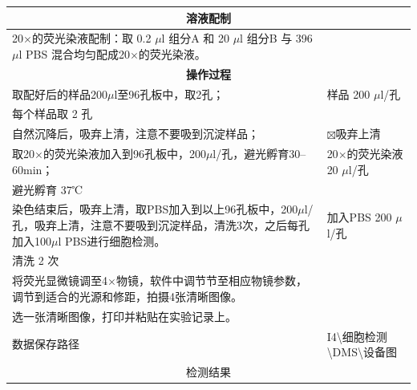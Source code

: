 \documentclass[UTF8,10pt,a4paper,fontset=fandol]{ctexart}
\newcommand{\fieldvalue}[1]{#1}
\newcommand{\handwritten}[1]{#1}
\begin{document}
\begin{tabularx}{\textwidth}{|p{}|X|}
\hline
\multicolumn{2}{|c|}{\textbf{溶液配制}} \\ \hline
20$\times$的荧光染液配制：取
\fieldvalue{\handwritten{0.2}} $\mu$l 组分A 和
\fieldvalue{\handwritten{20}} $\mu$l 组分B 与
\fieldvalue{\handwritten{396}} $\mu$l PBS 混合均匀配成20$\times$的荧光染液。 &
\\ \hline
\multicolumn{2}{|c|}{\textbf{操作过程}} \\ \hline
取配好后的样品200$\mu$l至96孔板中，取2孔； &
样品
\fieldvalue{\handwritten{200}} $\mu$l/孔\\
每个样品取
\fieldvalue{\handwritten{2}} 孔
\\ \hline
自然沉降后，吸弃上清，注意不要吸到沉淀样品； &
\fieldvalue{\(\boxtimes\)吸弃上清}
\\ \hline
取20$\times$的荧光染液加入到96孔板中，200$\mu$l/孔，避光孵育30--60min； &
20$\times$的荧光染液
\fieldvalue{\handwritten{20}} $\mu$l/孔\\
避光孵育
\fieldvalue{\handwritten{37℃}}
\\ \hline
染色结束后，吸弃上清，取PBS加入到以上96孔板中，200$\mu$l/孔，吸弃上清，注意不要吸到沉淀样品，清洗3次，之后每孔加入100$\mu$l PBS进行细胞检测。 &
加入PBS
\fieldvalue{\handwritten{200}} $\mu$l/孔\\
清洗
\fieldvalue{\handwritten{2}} 次
\\ \hline
将荧光显微镜调至4$\times$物镜，软件中调节节至相应物镜参数，调节到适合的光源和修距，拍摄4张清晰图像。\\
选一张清晰图像，打印并粘贴在实验记录上。 &
\\ \hline
数据保存路径 &
\fieldvalue{\handwritten{I4\textbackslash 细胞检测\textbackslash DMS\textbackslash 设备图}}
\\ \hline
\multicolumn{2}{|c|}{检测结果} \\ \hline
\end{tabularx}
\end{document}
